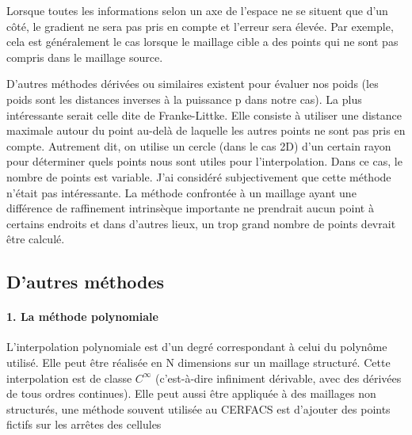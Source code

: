 Lorsque toutes les informations selon un axe de l'espace ne se situent que d'un côté, le gradient ne sera pas pris en compte et l'erreur sera élevée. Par exemple, cela est généralement le cas lorsque le maillage cible a des points qui ne sont pas compris dans le maillage source.

D'autres méthodes dérivées ou similaires existent pour évaluer nos poids (les poids sont les distances inverses à la puissance p dans notre cas). La plus intéressante serait celle dite de Franke-Littke. Elle consiste à utiliser une distance maximale autour du point au-delà de laquelle les autres points ne sont pas pris en compte. Autrement dit, on utilise un cercle (dans le cas 2D) d'un certain rayon pour déterminer quels points nous sont utiles pour l'interpolation. Dans ce cas, le nombre de points est variable.
J'ai considéré subjectivement que cette méthode n'était pas intéressante. La méthode confrontée à un maillage ayant une différence de raffinement intrinsèque importante ne prendrait aucun point à certains endroits et dans d'autres lieux, un trop grand nombre de points devrait être calculé.

\vspace{0,5 cm}


\newpage
\subsection{D'autres méthodes}
\paragraph{1. La méthode polynomiale}
\phantom{-}
\newline
L'interpolation polynomiale est d'un degré correspondant à celui du polynôme utilisé. Elle peut être réalisée en N dimensions sur un maillage structuré. Cette interpolation est de classe \(C^\infty\) (c'est-à-dire infiniment dérivable, avec des dérivées de tous ordres continues). Elle peut aussi être appliquée à des maillages non structurés, une méthode souvent utilisée au CERFACS est d'ajouter des points fictifs sur les arrêtes des cellules %

